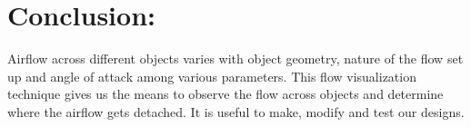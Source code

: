 \documentclass[12pt,a4paper]{article}
\begin{document}
\section{Conclusion:}
Airflow across different objects varies with object geometry, nature of the flow set up and angle of attack among various parameters. This flow visualization technique gives us the means to observe the flow across objects and determine where the airflow gets detached. It is useful to make, modify and test our designs.
\end{document}
